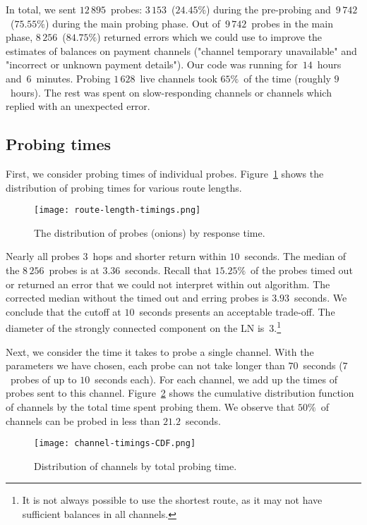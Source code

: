 In total, we sent $12\,895$~probes: $3\,153$~($24.45\%$) during the pre-probing and~$9\,742$~($75.55\%$) during the main probing phase.
Out of~$9\,742$~probes in the main phase, $8\,256$~($84.75\%$) returned errors which we could use to improve the estimates of balances on payment channels ("channel temporary unavailable" and "incorrect or unknown payment details").
Our code was running for~$14$~hours and~$6$~minutes. %
Probing $1\,628$~live channels took $65\%$~of the time (roughly $9$~hours).
The rest was spent on slow-responding channels or channels which replied with an unexpected error.


\subsection{Probing times}

First, we consider probing times of individual probes.
Figure~\ref{fig:route-length-timings} shows the distribution of probing times for various route lengths.

\begin{figure}[ht]
	\centering
	\texttt{[image: route-length-timings.png]}
	\caption{The distribution of probes (onions) by response time.}
	\label{fig:route-length-timings}
\end{figure}

Nearly all probes $3$~hops and shorter return within $10$~seconds.
The median of the $8\,256$~probes is at $3.36$~seconds.
Recall that $15.25\%$~of the probes timed out or returned an error that we could not interpret within out algorithm.
The corrected median without the timed out and erring probes is $3.93$~seconds. 
We conclude that the cutoff at $10$~seconds presents an acceptable trade-off.
The diameter of the strongly connected component on the LN is~$3$.\footnote{It is not always possible to use the shortest route, as it may not have sufficient balances in all channels.}

Next, we consider the time it takes to probe a single channel.
With the parameters we have chosen, each probe can not take longer than $70$~seconds ($7$~probes of up to $10$~seconds each).
For each channel, we add up the times of probes sent to this channel.
Figure~\ref{fig:channel-timings-CDF} shows the cumulative distribution function of channels by the total time spent probing them.
We observe that $50\%$~of channels can be probed in less than $21.2$~seconds.

\begin{figure}[ht]
	\centering
	\texttt{[image: channel-timings-CDF.png]}
	\caption{Distribution of channels by total probing time.}
	\label{fig:channel-timings-CDF}
\end{figure}


